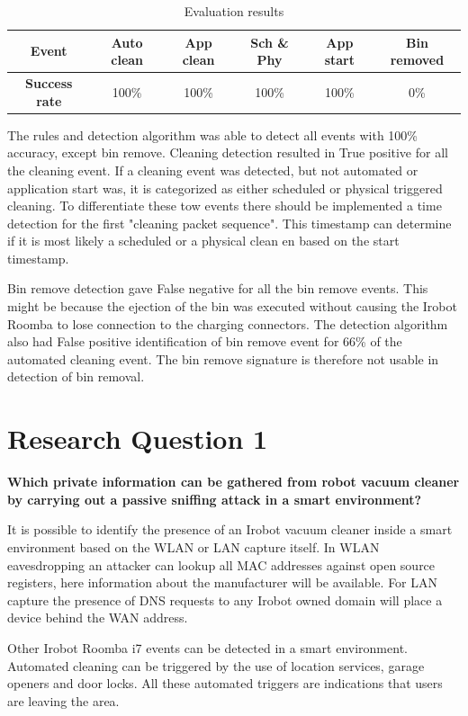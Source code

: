 \begin{table}[H]
\small
\centering
\caption{Evaluation results}
\label{tab:Evaluation results}
\begin{tabular}{|c|c|c|c|c|c|}
\hline
\textbf{Event}        & Auto clean & App clean & Sch \& Phy & App start & Bin removed \\ \hline
\textbf{Success rate} & 100\%           & 100\%             & 100\% & 100\%             & 0\%         \\ \hline
\end{tabular}
\end{table}

The rules and detection algorithm was able to detect all events with 100\% accuracy, except bin remove. Cleaning detection resulted in True positive for all the cleaning event. If a cleaning event was detected, but not automated or application start was, it is categorized as either scheduled or physical triggered cleaning. To differentiate these tow events there should be implemented a time detection for the first "cleaning packet sequence". This timestamp can determine if it is most likely a scheduled or a physical clean en based on the start timestamp. 

Bin remove detection gave False negative for all the bin remove events. This might be because the ejection of the bin was executed without causing the Irobot Roomba to lose connection to the charging connectors. The detection algorithm also had False positive identification of bin remove event for 66\% of the automated cleaning event. The bin remove signature is therefore not usable in detection of bin removal. 


\section{Research Question 1}
\textbf{Which private information can be gathered from robot vacuum cleaner by carrying out a passive sniffing attack in a smart environment?}

It is possible to identify the presence of an Irobot vacuum cleaner inside a smart environment based on the WLAN or LAN capture itself. In WLAN eavesdropping an attacker can lookup all  MAC addresses against open source registers, here information about the manufacturer will be available. For LAN capture the presence of DNS requests to any Irobot owned domain will place a device behind the WAN address.

Other Irobot Roomba i7 events can be detected in a smart environment. Automated cleaning can be triggered by the use of location services, garage openers and door locks. All these automated triggers are indications that users are leaving the area. 

